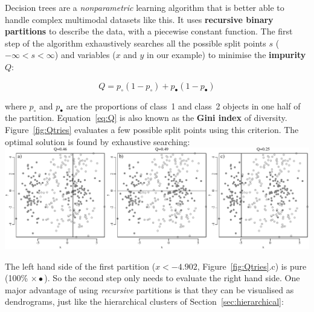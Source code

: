 Decision trees are a \textit{nonparametric} learning algorithm that is
better able to handle complex multimodal datasets like this. It uses
\textbf{recursive binary partitions} to describe the data, with a
piecewise constant function. The first step of the algorithm
exhaustively searches all the possible split points $s$ ($-\infty < s
< \infty$) and variables ($x$ and $y$ in our example) to minimise the
\textbf{impurity} $Q$:

\begin{equation}
  Q = p_{\circ} (1-p_{\circ}) + p_{\bullet} (1-p_{\bullet})
  \label{eq:Q}
\end{equation}

\noindent where $p_{\circ}$ and $p_{\bullet}$ are the proportions of
class~1 and class~2 objects in one half of the partition.
Equation~\ref{eq:Q} is also known as the \textbf{Gini index} of
diversity.  Figure~\ref{fig:Qtries} evaluates a few possible split
points using this criterion.  The optimal solution is found by
exhaustive searching:\\

\noindent\includegraphics[width=\textwidth]{../figures/Qtries.pdf}
\begingroup {}
\label{fig:Qtries}
\endgroup

The left hand side of the first partition ($x<-4.902$,
Figure~\ref{fig:Qtries}.c) is pure (100\% $\times\bullet$). So the
second step only needs to evaluate the right hand side. One major
advantage of using \textit{recursive} partitions is that they can be
visualised as dendrograms, just like the hierarchical clusters of
Section~\ref{sec:hierarchical}:\\

